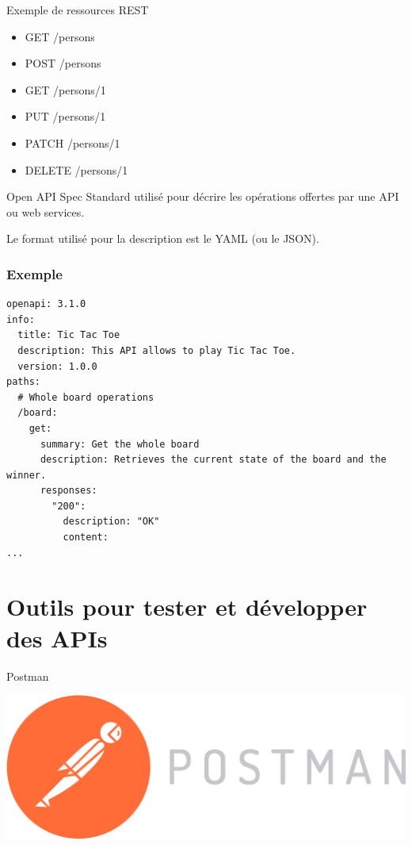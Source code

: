 \documentclass{beamer}
\begin{document}
\begin{frame}{Exemple de ressources REST}
\begin{itemize}
  \item GET /persons
  \item POST /persons
  \item GET /persons/1
  \item PUT /persons/1
  \item PATCH /persons/1
  \item DELETE /persons/1
\end{itemize}
\end{frame}

\begin{frame}{Open API Spec}
Standard utilisé pour décrire les opérations offertes par une API ou web services.

Le format utilisé pour la description est le YAML (ou le JSON).
\end{frame}

\begin{frame}[fragile]
\frametitle{Exemple}
\begin{Verbatim}[fontsize=\scriptsize]
openapi: 3.1.0
info:
  title: Tic Tac Toe
  description: This API allows to play Tic Tac Toe.
  version: 1.0.0
paths:
  # Whole board operations
  /board:
    get:
      summary: Get the whole board
      description: Retrieves the current state of the board and the winner.
      responses:
        "200":
          description: "OK"
          content:
...
\end{Verbatim}  
\end{frame}

\section{Outils pour tester et développer des APIs}
\begin{frame}{Postman}
\begin{center}
  \includegraphics[scale=0.2]{images/postman-logo.png}
\end{center}
\end{frame}
\end{document}
